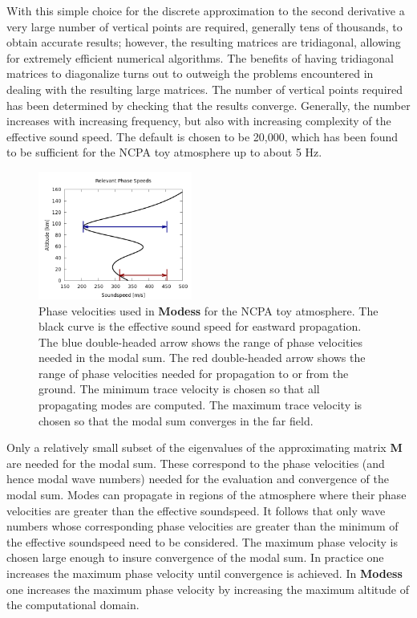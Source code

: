 With this simple choice for the discrete approximation to the second derivative a very large number of vertical points are required, generally tens of thousands, to obtain accurate results; however, the resulting matrices are tridiagonal, allowing for extremely efficient numerical algorithms. The benefits of having tridiagonal matrices to diagonalize turns out to outweigh the problems encountered in dealing with the resulting large matrices. The number of vertical points required has been determined by checking that the results converge. Generally, the number increases with increasing frequency, but also with increasing complexity of the effective sound speed. The default is chosen to be 20,000, which has been found to be sufficient for the NCPA toy atmosphere up to about 5 Hz. 

\begin{figure}
\begin{center}
\includegraphics[width=0.45\textwidth]{figs/wvnums_modess}
\end{center}
\caption{Phase velocities used in {\bf Modess} for the NCPA toy atmosphere. The black curve is the effective sound speed for eastward propagation. The blue double-headed arrow shows the range of phase velocities needed in the modal sum. The red double-headed arrow shows the range of phase velocities needed for propagation to or from the ground. The minimum trace velocity is chosen so that all propagating modes are computed. The maximum trace velocity is chosen so that the modal sum converges in the far field. }
\label{fig:wvnums_modess}
\end{figure}

Only a relatively small subset of the eigenvalues of the approximating matrix \textbf{M} are needed for the modal sum. These correspond to the phase velocities (and hence modal wave numbers) needed for the evaluation and convergence of the modal sum. Modes can propagate in regions of the atmosphere where their phase velocities are greater than the effective soundspeed. It follows that only wave numbers whose corresponding phase velocities are greater than the minimum of the effective soundspeed need to be considered. The maximum phase velocity is chosen large enough to insure convergence of the modal sum. In practice one increases the maximum phase velocity until convergence is achieved. In {\bf Modess} one increases the maximum phase velocity by increasing the maximum altitude of the computational domain. 

